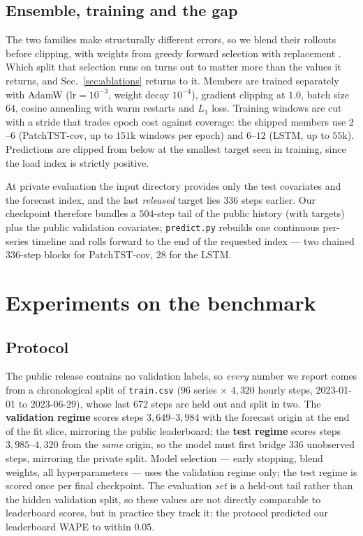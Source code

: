 \documentclass[10pt,twocolumn]{article}
\begin{document}
\subsection{Ensemble, training and the gap}

The two families make structurally different errors, so we blend their rollouts
before clipping, with weights from greedy forward selection with replacement
\cite{caruana2004ensemble}. Which split that selection runs on turns out to matter
more than the values it returns, and Sec.~\ref{sec:ablations} returns to it.
Members are trained separately with AdamW ($\text{lr}=10^{-3}$, weight decay
$10^{-4}$), gradient clipping at $1.0$, batch size $64$, cosine annealing with warm
restarts \cite{loshchilov2017sgdr} and $L_1$ loss. Training windows are cut with a
stride that trades epoch cost against coverage: the shipped members use $2$--$6$
(PatchTST-cov, up to $151$k windows per epoch) and $6$--$12$ (LSTM, up to $55$k).
Predictions are clipped from below at the smallest target seen in training, since
the load index is strictly positive.

At private evaluation the input directory provides only the test covariates and the
forecast index, and the last \emph{released} target lies $336$ steps earlier. Our
checkpoint therefore bundles a $504$-step tail of the public history (with targets)
plus the public validation covariates; \texttt{predict.py} rebuilds one continuous
per-series timeline and rolls forward to the end of the requested index --- two
chained $336$-step blocks for PatchTST-cov, $28$ for the LSTM.

\section{Experiments on the benchmark}
\label{sec:experiments}

\subsection{Protocol}
\label{sec:protocol}

The public release contains no validation labels, so \emph{every} number we report
comes from a chronological split of \texttt{train.csv} ($96$ series
$\times$ $4{,}320$ hourly steps, 2023-01-01 to 2023-06-29), whose last $672$ steps
are held out and split in two. The \textbf{validation regime} scores steps
$3{,}649$--$3{,}984$ with the forecast origin at the end of the fit slice,
mirroring the public leaderboard; the \textbf{test regime} scores steps
$3{,}985$--$4{,}320$ from the \emph{same} origin, so the model must first bridge
$336$ unobserved steps, mirroring the private split. Model selection --- early
stopping, blend weights, all hyperparameters --- uses the validation regime only;
the test regime is scored once per final checkpoint. The evaluation \emph{set} is a
held-out tail rather than the hidden validation split, so these values are not
directly comparable to leaderboard scores, but in practice they track it: the
protocol predicted our leaderboard WAPE to within $0.05$.
\end{document}
